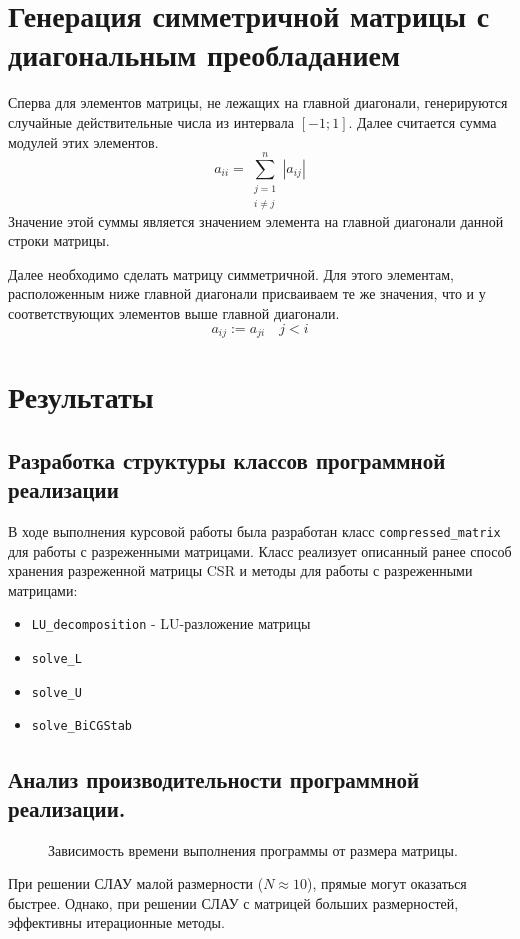 \documentclass[a4paper, fontsize=14pt]{article}
\begin{document}
\section{Генерация симметричной матрицы с диагональным преобладанием}
Сперва для элементов матрицы, не лежащих на главной диагонали, генерируются случайные действительные
числа из интервала $[-1;1]$. Далее считается сумма модулей этих элементов. 
$$
    a_{ii} = \sum^{n}_{\substack{j=1\\ i \neq j}} |a_{ij}| 
$$
Значение этой суммы является значением элемента на главной диагонали данной строки матрицы. 

Далее необходимо сделать матрицу симметричной. Для этого элементам, расположенным ниже главной
диагонали присваиваем те же значения, что и у соответствующих элементов выше главной диагонали.
$$
    a_{ij} := a_{ji} \quad j<i
$$
\section{Результаты}
\subsection{Разработка структуры классов программной реализации}
В ходе выполнения курсовой работы была разработан класс \verb|compressed_matrix| для работы 
с разреженными матрицами. Класс реализует описанный ранее способ хранения разреженной матрицы CSR и
методы для работы с разреженными матрицами:
\begin{itemize}
    \item \verb|LU_decomposition| - LU-разложение матрицы 
    \item \verb|solve_L|
    \item \verb|solve_U|
    \item \verb|solve_BiCGStab|


\end{itemize}


\subsection{Анализ производительности программной реализации.}
\begin{figure}[h]
    \scriptsize
    \centering
    
    \caption{Зависимость времени выполнения программы от размера матрицы.}
    \label{fig:comp}
\end{figure}
При решении СЛАУ малой размерности ($N \approx 10$), прямые могут оказаться быстрее.
Однако, при решении СЛАУ с матрицей больших размерностей, эффективны итерационные методы. 
\end{document}
